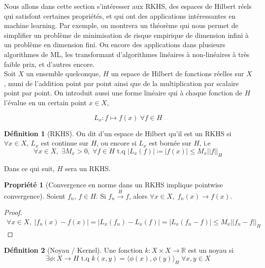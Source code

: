 \documentclass[a4paper, 11pt, french]{article}
\theoremstyle{definition}
\newtheorem{definition}{Définition}
\newtheorem{property}{Propriété}
\begin{document}
	Nous allons dans cette section s'intéresser aux RKHS, des espaces de Hilbert réels qui satisfont certaines propriétés, et qui ont des applications intéressantes en machine learning. Par exemple, on montrera un théorème qui nous permet de simplifier un problème de minimisation de risque empirique de dimension infini à un problème en dimension fini. Ou encore des applications dans plusieurs algorithmes de ML, les transformant d'algorithmes linéaires à non-linéaires à très faible prix, et d'autres encore. \\
	
	Soit $X$ un ensemble quelconque, $H$ un espace de Hilbert de fonctions réelles sur $X$, muni de l'addition point par point ainsi que de la multiplication par scalaire point par point. On introduit aussi une forme linéaire qui à chaque fonction de $H$ l'évalue en un certain point $x \in X$,
	
	\[L_x : f \mapsto f(x) \; \forall f \in H\]
		
	\begin{definition}[RKHS]
		On dit d'un espace de Hilbert qu'il est un RKHS si $\forall x \in X$, $L_x$ est continue sur $H$, ou encore si $L_x$ est bornée sur $H$, i.e
		\[\forall x \in X, \;  \exists M_x > 0, \; \forall f \in H \text{ t.q } |L_x(f)| \coloneqq |f(x)| \leq M_x ||f||_H\]
	\end{definition}

	Dans ce qui suit, $H$ sera un RKHS.

	\begin{property}[Convergence en norme dans un RKHS implique pointwise convergence]
		Soient $f_n, \, f \in H$. Si $f_n \stackrel{H}{\to} f$, alors $\forall x \in X, \; f_n(x) \to f(x)$.
	\end{property}
	\begin{proof}
		\begin{align*}
			\forall x \in X, \; |f_n(x) - f(x)| = |L_x(f_n) - L_x(f)| = |L_x(f_n - f)| \leq M_x||f_n - f||_H
		\end{align*}
	\end{proof}

	\begin{definition}[Noyau / Kernel]
		Une fonction $k : X \times X \to \mathbb{R}$ est un noyau si
		\[ \exists \phi : X \to H \text{ t.q } k(x,y) = \langle \phi (x), \phi(y) \rangle_H \; \forall x,y \in X \]
	\end{definition}
\end{document}
